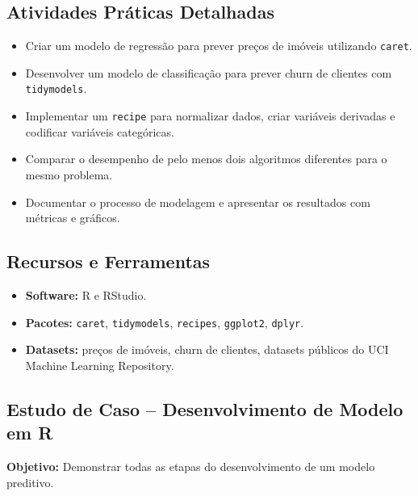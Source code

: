 \subsection{\textcolor{subsectionblue}{Atividades Práticas Detalhadas}}
\begin{itemize}
  \item Criar um modelo de regressão para prever preços de imóveis utilizando \texttt{caret}.
  \item Desenvolver um modelo de classificação para prever churn de clientes com \texttt{tidymodels}.
  \item Implementar um \texttt{recipe} para normalizar dados, criar variáveis derivadas e codificar variáveis categóricas.
  \item Comparar o desempenho de pelo menos dois algoritmos diferentes para o mesmo problema.
  \item Documentar o processo de modelagem e apresentar os resultados com métricas e gráficos.
\end{itemize}

\subsection{\textcolor{subsectionblue}{Recursos e Ferramentas}}
\begin{itemize}
  \item \textbf{Software:} R e RStudio.
  \item \textbf{Pacotes:} \texttt{caret}, \texttt{tidymodels}, \texttt{recipes}, \texttt{ggplot2}, \texttt{dplyr}.
  \item \textbf{Datasets:} preços de imóveis, churn de clientes, datasets públicos do UCI Machine Learning Repository.
\end{itemize}

\subsection{\textcolor{subsectionblue}{Estudo de Caso – Desenvolvimento de Modelo em R}}
\textbf{Objetivo:} Demonstrar todas as etapas do desenvolvimento de um modelo preditivo.


